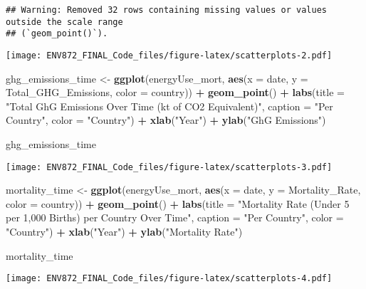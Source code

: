 \documentclass[
]{article}
\newenvironment{Shaded}{\begin{snugshade}}{\end{snugshade}}
\newcommand{\AttributeTok}[1]{\textcolor[rgb]{0.13,0.29,0.53}{#1}}
\newcommand{\FunctionTok}[1]{\textcolor[rgb]{0.13,0.29,0.53}{\textbf{#1}}}
\newcommand{\NormalTok}[1]{#1}
\newcommand{\OtherTok}[1]{\textcolor[rgb]{0.56,0.35,0.01}{#1}}
\newcommand{\SpecialCharTok}[1]{\textcolor[rgb]{0.81,0.36,0.00}{\textbf{#1}}}
\newcommand{\StringTok}[1]{\textcolor[rgb]{0.31,0.60,0.02}{#1}}
\begin{document}
\begin{verbatim}
## Warning: Removed 32 rows containing missing values or values outside the scale range
## (`geom_point()`).
\end{verbatim}

\texttt{[image: ENV872\_FINAL\_Code\_files/figure-latex/scatterplots-2.pdf]}

\begin{Shaded}
\begin{Highlighting}[]
\NormalTok{ghg\_emissions\_time }\OtherTok{\textless{}{-}} \FunctionTok{ggplot}\NormalTok{(energyUse\_mort, }\FunctionTok{aes}\NormalTok{(}\AttributeTok{x =}\NormalTok{ date,}
    \AttributeTok{y =}\NormalTok{ Total\_GHG\_Emissions, }\AttributeTok{color =}\NormalTok{ country)) }\SpecialCharTok{+}
    \FunctionTok{geom\_point}\NormalTok{() }\SpecialCharTok{+} \FunctionTok{labs}\NormalTok{(}\AttributeTok{title =} \StringTok{"Total GhG Emissions Over Time (kt of CO2 Equivalent)"}\NormalTok{,}
    \AttributeTok{caption =} \StringTok{"Per Country"}\NormalTok{, }\AttributeTok{color =} \StringTok{"Country"}\NormalTok{) }\SpecialCharTok{+}
    \FunctionTok{xlab}\NormalTok{(}\StringTok{"Year"}\NormalTok{) }\SpecialCharTok{+} \FunctionTok{ylab}\NormalTok{(}\StringTok{"GhG Emissions"}\NormalTok{)}

\NormalTok{ghg\_emissions\_time}
\end{Highlighting}
\end{Shaded}

\texttt{[image: ENV872\_FINAL\_Code\_files/figure-latex/scatterplots-3.pdf]}

\begin{Shaded}
\begin{Highlighting}[]
\NormalTok{mortality\_time }\OtherTok{\textless{}{-}} \FunctionTok{ggplot}\NormalTok{(energyUse\_mort, }\FunctionTok{aes}\NormalTok{(}\AttributeTok{x =}\NormalTok{ date,}
    \AttributeTok{y =}\NormalTok{ Mortality\_Rate, }\AttributeTok{color =}\NormalTok{ country)) }\SpecialCharTok{+} \FunctionTok{geom\_point}\NormalTok{() }\SpecialCharTok{+}
    \FunctionTok{labs}\NormalTok{(}\AttributeTok{title =} \StringTok{"Mortality Rate (Under 5 per 1,000 Births) per Country Over Time"}\NormalTok{,}
        \AttributeTok{caption =} \StringTok{"Per Country"}\NormalTok{, }\AttributeTok{color =} \StringTok{"Country"}\NormalTok{) }\SpecialCharTok{+}
    \FunctionTok{xlab}\NormalTok{(}\StringTok{"Year"}\NormalTok{) }\SpecialCharTok{+} \FunctionTok{ylab}\NormalTok{(}\StringTok{"Mortality Rate"}\NormalTok{)}

\NormalTok{mortality\_time}
\end{Highlighting}
\end{Shaded}

\texttt{[image: ENV872\_FINAL\_Code\_files/figure-latex/scatterplots-4.pdf]}
\end{document}
